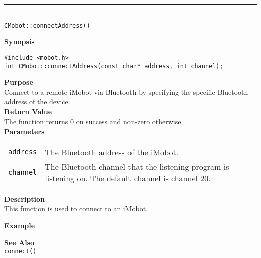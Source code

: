 \noindent
\vspace{5pt}
\rule{4.5in}{0.015in} \\
\noindent
{\LARGE \texttt{CMobot::connectAddress()}}\\
{}

\noindent
{\bf Synopsis}\\
\begin{verbatim}
#include <mobot.h>
int CMobot::connectAddress(const char* address, int channel);
\end{verbatim}

\noindent
{\bf Purpose}\\
Connect to a remote iMobot via Bluetooth by specifying the specific Bluetooth
address of the device.\\

\noindent
{\bf Return Value}\\
The function returns 0 on success and non-zero otherwise.\\

\noindent
{\bf Parameters}
\vspace{-0.1in}
\begin{description}
\item               
\begin{tabular}{p{10 mm}p{145 mm}}
\texttt{address} & The Bluetooth address of the iMobot. \\
\texttt{channel} & The Bluetooth channel that the listening program is
listening on. The default channel is channel 20. \\
\end{tabular}
\end{description}

\noindent
{\bf Description}\\
This function is used to connect to an iMobot. 

\noindent
{\bf Example}\\
\noindent

\noindent
{\bf See Also}\\
\texttt{connect()}

